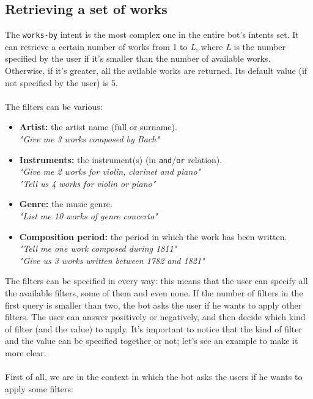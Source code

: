 \documentclass[a4paper,12pt]{report}
\begin{document}
	\subsection{Retrieving a set of works}
	The \texttt{works-by} intent is the most complex one in the entire bot's intents set. It can retrieve a certain number of works from 1 to \textit{L}, where \textit{L} is the number specified by the user if it's smaller than the number of available works. Otherwise, if it's greater, all the avilable works are returned. Its default value (if not specified by the user) is 5.\\\\
	The filters can be various:
	\begin{itemize}
		\item \textbf{Artist:}
		the artist name (full or surname).\\
		\textit{"Give me 3 works composed by Bach"}
		
		\item \textbf{Instruments:}
		the instrument(s) (in \texttt{and}/\texttt{or} relation).\\
		\textit{"Give me 2 works for violin, clarinet and piano"}\\
		\textit{"Tell us 4 works for violin or piano"}
		
		\item \textbf{Genre:}
		the music genre.\\
		\textit{"List me 10 works of genre concerto"}
		
		\item \textbf{Composition period:}
		the period in which the work has been written.\\
		\textit{"Tell me one work composed during 1811"}\\
		\textit{"Give us 3 works written between 1782 and 1821"}
		
	\end{itemize}
	The filters can be specified in every way: this means that the user can specify all the available filters, some of them and even none. If the number of filters in the first query is smaller than two, the bot asks the user if he wants to apply other filters. The user can answer positively or negatively, and then decide which kind of filter (and the value) to apply. It's important to notice that the kind of filter and the value can be specified together or not; let's see an example to make it more clear.\\\\
	First of all, we are in the context in which the bot asks the users if he wants to apply some filters:
	
\end{document}
